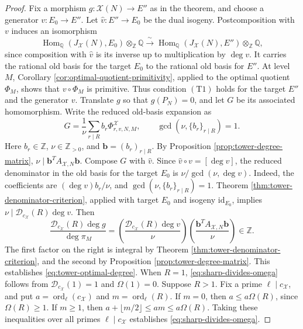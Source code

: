 \documentclass[12pt, letterpaper]{amsart}
\theoremstyle{definition}
\theoremstyle{remark}
\newcommand{\Q}{\mathbb Q}
\newcommand{\Z}{\mathbb Z}
\newcommand{\Hom}{\operatorname{Hom}}
\DeclareMathOperator{\ord}{ord}
\numberwithin{equation}{section}
\begin{document}
\begin{proof}
Fix a morphism \(g:\mathcal X(N)\to E''\) as in the theorem, and choose a
generator \(v:E_0\to E''\).
Let \(\widehat v:E''\to E_0\) be the dual isogeny.
Postcomposition with \(v\) induces an isomorphism
\[
 \Hom_\Q(J_{\mathcal X}(N),E_0)\otimes_\Z\Q
 \xrightarrow{\ \sim\ }
 \Hom_\Q(J_{\mathcal X}(N),E'')\otimes_\Z\Q,
\]
since
composition with \(\widehat v\) is its inverse up to multiplication by
\(\deg v\). It carries the rational old basis for the target \(E_0\)
to the rational old basis for \(E''\). At level \(M\), Corollary
\ref{cor:optimal-quotient-primitivity}, applied to the optimal quotient
\(\Phi_M\), shows that \(v\circ\Phi_M\) is primitive.
Thus condition \hyperlink{tower-condition-T1}{\(\mathrm{(T1)}\)} holds for the target \(E''\) and
the generator \(v\).
Translate \(g\) so that \(g(P_N)=0\), and let \(G\) be its associated
homomorphism. Write the reduced old-basis expansion as
\[
        G=\frac1\nu\sum_{r\mid R}b_r
        \Phi^{\mathcal X}_{r,v,N,M},
        \qquad
        \gcd(\nu,\{b_r\}_{r\mid R})=1.
\]
Here \(b_r\in\Z\), \(\nu\in\Z_{>0}\), and
\(\boldsymbol b=(b_r)_{r\mid R}\).
By Proposition \ref{prop:tower-degree-matrix},
\(\nu\mid\boldsymbol b^{T}A_{\mathcal X,N}\boldsymbol b\).
Compose \(G\) with \(\widehat v\). Since
\(\widehat v\circ v=[\deg v]\), the reduced denominator in the old basis for
the target \(E_0\) is \(\nu/\gcd(\nu,\deg v)\). Indeed, the coefficients are
\((\deg v)b_r/\nu\), and
\(\gcd(\nu,\{b_r\}_{r\mid R})=1\). Theorem
\ref{thm:tower-denominator-criterion}, applied with target \(E_0\) and
isogeny \(\mathrm{id}_{E_0}\), implies
\(\nu\mid\mathcal D_{c_{\mathcal X}}(R)\deg v\). Then
\[
        \frac{\mathcal D_{c_{\mathcal X}}(R)\deg g}{\deg\pi_M}
        =
        \left(\frac{\mathcal D_{c_{\mathcal X}}(R)\deg v}{\nu}\right)
        \left(\frac{\boldsymbol b^{T}A_{\mathcal X,N}
        \boldsymbol b}{\nu}\right)
        \in\Z.
\]
The first factor on the right is integral by Theorem
\ref{thm:tower-denominator-criterion}, and the second by Proposition
\ref{prop:tower-degree-matrix}.
This establishes \eqref{eq:tower-optimal-degree}. When \(R=1\),
\eqref{eq:sharp-divides-omega} follows from
\(\mathcal D_{c_{\mathcal X}}(1)=1\) and \(\Omega(1)=0\). Suppose \(R>1\).
Fix a prime \(\ell\mid c_{\mathcal X}\), and put
\(a=\ord_\ell(c_{\mathcal X})\) and \(m=\ord_\ell(R)\). If \(m=0\), then
\(a\le a\Omega(R)\), since \(\Omega(R)\ge1\). If \(m\ge1\), then
\(a+\lfloor m/2\rfloor\le am\le a\Omega(R)\).
Taking these inequalities over all primes \(\ell\mid c_{\mathcal X}\) establishes
\eqref{eq:sharp-divides-omega}.
\end{proof}
\end{document}

